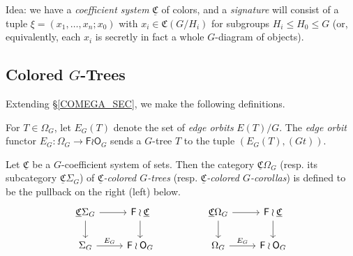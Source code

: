 \documentclass[a4paper,10pt
,draft
]{article}%
\renewcommand{\phi}{\varphi}
\newcommand{\UC}{\underline{\mathfrak C}}
\renewcommand{\1}{\ensuremath{\mathbb{id}}}
\begin{document}
Idea: we have a \textit{coefficient system} $\UC$ of colors, and
a \textit{signature} will consist of a tuple $\xi = (x_1, \dots, x_n;x_0)$
with $x_i \in \mathfrak C(G/H_i)$ for subgroups $H_i \leq H_0 \leq G$
(or, equivalently, each $x_i$ is secretly in fact a whole $G$-diagram of objects).

\subsection{Colored $G$-Trees}

Extending \S \ref{COMEGA_SEC}, we make the following definitions.

\begin{definition}
      \label{EG_DEFN}
      For $T \in \Omega_G$, let $E_G(T)$ denote the set of \textit{edge orbits} $E(T)/G$.
      The \textit{edge orbit} functor $E_G: \Omega_G \to \mathsf F \wr \mathsf O_G$ sends a $G$-tree $T$ to
      the tuple $(E_G(T), (Gt))$.
\end{definition}

\begin{definition}
      Let $\underline{\mathfrak C}$ be a $G$-coefficient system of sets.
      Then the category $\underline{\mathfrak C}\Omega_G$ (resp. its subcategory $\UC \Sigma_G$)
      of \textit{$\underline{\mathfrak C}$-colored $G$-trees}
      (resp. \textit{$\UC$-colored $G$-corollas})
      is defined to be the pullback on the right (left) below.
      \begin{equation}
            \label{COMEGAG_OG_EQ}
            \begin{tikzcd}
                  \UC \Sigma_G \arrow[d] \arrow[r]
                  &
                  \mathsf F \wr \UC \arrow[d]
                  &&
                  \UC \Omega_G \arrow[d] \arrow[r]
                  &
                  \mathsf F \wr \underline{\mathfrak C} \arrow[d]
                  \\
                  \Sigma_G \arrow[r, "E_G"]
                  &
                  \mathsf F \wr \mathsf O_G
                  &&
                  \Omega_G \arrow[r, "E_G"]
                  &
                  \mathsf F \wr \mathsf O_G
            \end{tikzcd}
      \end{equation}
\end{definition}
\end{document}
